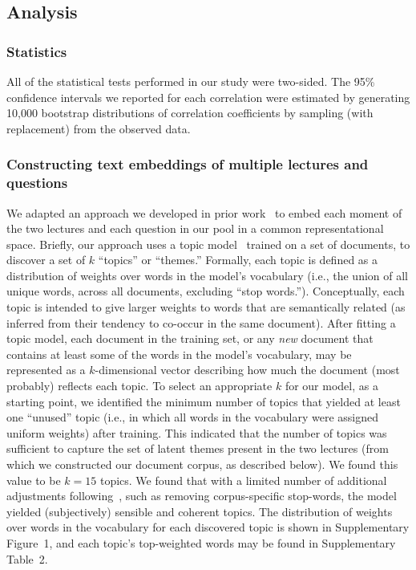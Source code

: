 \documentclass[10pt]{article}
\newcommand{\topics}{2}
\newcommand{\topicWordWeights}{1}
\begin{document}
\subsection*{Analysis}

\subsubsection*{Statistics}

All of the statistical tests performed in our study were two-sided. The 95\%
confidence intervals we reported for each correlation were estimated by
generating 10,000 bootstrap distributions of correlation coefficients by
sampling (with replacement) from the observed data.

\subsubsection*{Constructing text embeddings of multiple lectures and questions}\label{subsec:topic-modeling}

We adapted an approach we developed in prior work~\citep{HeusEtal21} to embed
each moment of the two lectures and each question in our pool in a common
representational space. Briefly, our approach uses a topic model~\citep[Latent
Dirichlet Allocation; ][]{BleiEtal03} trained on a set of documents, to
discover a set of $k$ ``topics'' or ``themes.'' Formally, each topic is
defined as a distribution of weights over words in the model's vocabulary
(i.e., the union of all unique words, across all documents, excluding ``stop
words.''). Conceptually, each topic is intended to give larger weights to words
that are semantically related (as inferred from their tendency to co-occur in
the same document). After fitting a topic model, each document in the training
set, or any \textit{new} document that contains at least some of the words in
the model's vocabulary, may be represented as a $k$-dimensional vector
describing how much the document (most probably) reflects each topic. To select
an appropriate $k$ for our model, as a starting point, we identified the
minimum number of topics that yielded at least one ``unused'' topic (i.e., in
which all words in the vocabulary were assigned uniform weights) after
training. This indicated that the number of topics was sufficient to capture
the set of latent themes present in the two lectures (from which we constructed
our document corpus, as described below). We found this value to be $k = 15$
topics. We found that with a limited number of additional adjustments
following~\citet{BoydEtal14}, such as removing corpus-specific stop-words, the
model yielded (subjectively) sensible and coherent topics. The distribution of
weights over words in the vocabulary for each discovered topic is shown in
Supplementary Figure~\topicWordWeights, and each topic's top-weighted words may
be found in Supplementary Table~\topics.
\end{document}
